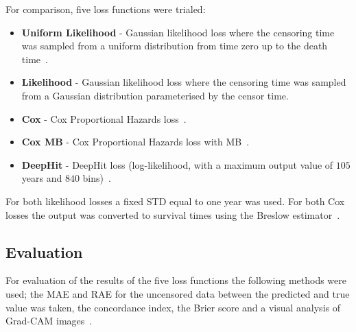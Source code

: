         For comparison, five loss functions were trialed:

        \begin{itemize}
            \item \textbf{Uniform Likelihood} - Gaussian likelihood loss where the censoring time was sampled from a uniform distribution from time zero up to the death time~\cite{Shahin2023DeepAnalysis}.

            \item \textbf{Likelihood} - Gaussian likelihood loss where the censoring time was sampled from a Gaussian distribution parameterised by the censor time.

            \item \textbf{Cox} - Cox Proportional Hazards loss~\cite{Cox1972RegressionLife-Tables}.

            \item \textbf{Cox \gls{MB}} - Cox Proportional Hazards loss with \gls{MB}~\cite{Shahin2022SurvivalData}.

            \item \textbf{DeepHit} - DeepHit loss (log-likelihood, with a maximum output value of $105$ years and $840$ bins)~\cite{Lee2018DeepHit:Risks}.
        \end{itemize}

        For both likelihood losses a fixed \gls{STD} equal to one year was used. For both Cox losses the output was converted to survival times using the Breslow estimator~\cite{Breslow1974CovarianceData}.

    \subsection{Evaluation} \label{sec:evaluation}
        For evaluation of the results of the five loss functions the following methods were used; the \gls{MAE} and \gls{RAE} for the uncensored data between the predicted and true value was taken, the concordance index, the Brier score and a visual analysis of Grad-CAM images~\cite{Raykar2008OnIndex, Gerds2006ConsistentTimes, Selvaraju2020Grad-CAM:Localization}.
